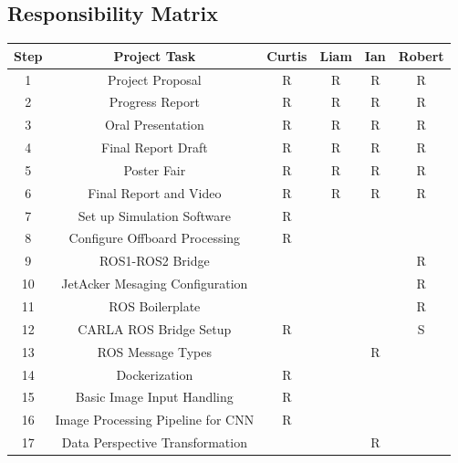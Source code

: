 \documentclass[titlepage, draft]{article}
\begin{document}
\subsection{Responsibility Matrix}
\begin{table}[H]
	\centering
	\begin{tabular}{|c | c | c | c | c | c |}
		\hline
		Step & Project Task                         & Curtis & Liam & Ian & Robert \\ [0.5ex]
		\hline
		1    & Project Proposal                     & R      & R    & R   & R      \\
		\hline
		2    & Progress Report                      & R      & R    & R   & R      \\
		\hline
		3    & Oral Presentation                    & R      & R    & R   & R      \\
		\hline
		4    & Final Report Draft                   & R      & R    & R   & R      \\
		\hline
		5    & Poster Fair                          & R      & R    & R   & R      \\
		\hline
		6    & Final Report and Video               & R      & R    & R   & R      \\
		\hline
		7    & Set up Simulation Software           & R      &      &     &        \\
		\hline
		8    & Configure Offboard Processing        & R      &      &     &        \\
		\hline
		9    & ROS1-ROS2 Bridge                     &        &      &     & R      \\
		\hline
		10   & JetAcker Mesaging Configuration      &        &      &     & R      \\
		\hline
		11   & ROS Boilerplate                      &        &      &     & R      \\
		\hline
		12   & CARLA ROS Bridge Setup               & R      &      &     & S      \\
		\hline
		13   & ROS Message Types                    &        &      & R   &        \\
		\hline
		14   & Dockerization                        & R      &      &     &        \\
		\hline
		15   & Basic Image Input Handling           & R      &      &     &        \\
		\hline
		16   & Image Processing Pipeline for CNN    & R      &      &     &        \\
		\hline
		17   & Data Perspective Transformation      &        &      & R   &        \\

\end{tabular}
\end{table}
\end{document}
